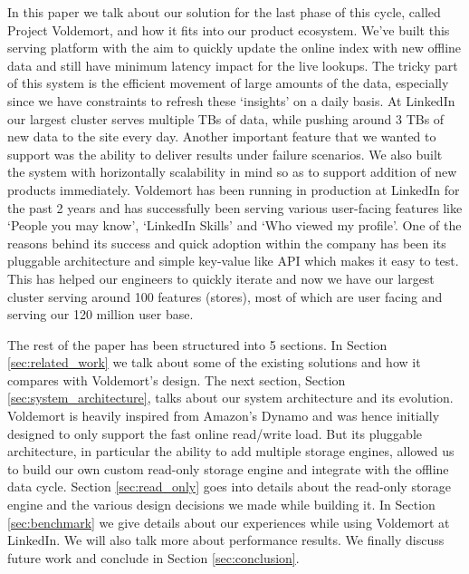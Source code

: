 \documentclass[10pt,twocolumn,preprint,natbib,authoryear]{sigplanconf}
\begin{document}
In this paper we talk about our solution for the last phase of this cycle, called Project Voldemort, and how it fits into our product ecosystem. We've built this serving platform with the aim to quickly update the online index with new offline data and still have minimum latency impact for the live lookups. The tricky part of this system is the efficient movement of large amounts of the data, especially since we have constraints to refresh these `insights' on a daily basis. At LinkedIn our largest cluster serves multiple TBs of data, while pushing around 3 TBs of new data to the site every day. Another important feature that we wanted to support was the ability to deliver results under failure scenarios. We also built the system with horizontally scalability in mind so as to support addition of new products immediately. Voldemort has been running in production at LinkedIn for the past 2 years and has successfully been serving various user-facing features like `People you may know', `LinkedIn Skills' and `Who viewed my profile'. One of the reasons behind its success and quick adoption within the company has been its pluggable architecture and simple key-value like API which makes it easy to test. This has helped our engineers to quickly iterate and now we have our largest cluster serving around 100 features (stores), most of which are user facing and serving our 120 million user base.

The rest of the paper has been structured into 5 sections. In Section \ref{sec:related_work} we talk about some of the existing solutions and how it compares with Voldemort's design. The next section, Section \ref{sec:system_architecture},  talks about our system architecture and its evolution. Voldemort is heavily inspired from Amazon's Dynamo\cite{dynamo} and was hence initially designed to only support the fast online read/write load. But its pluggable architecture, in particular the ability to add multiple storage engines, allowed us to build our own custom read-only storage engine and integrate with the offline data cycle. Section \ref{sec:read_only} goes into details about the read-only storage engine and the various design decisions we made while building it. In Section \ref{sec:benchmark} we give details about our experiences while using Voldemort at LinkedIn. We will also talk more about performance results. We finally discuss future work and conclude in Section \ref{sec:conclusion}. 

\end{document}
